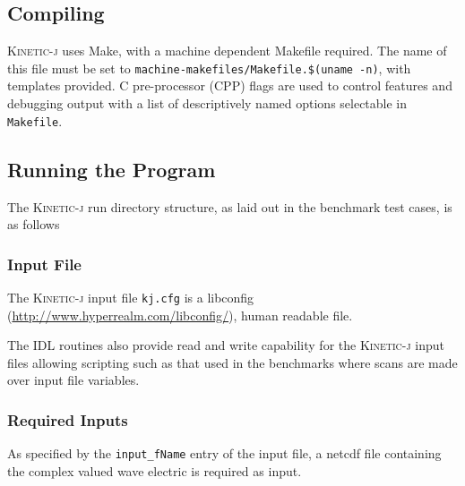 \documentclass[final,5p,times,twocolumn]{elsarticle}
\newcommand{\kj}{\textsc{Kinetic-j}\xspace}
\begin{document}
\subsection{Compiling}
\label{section:compiling}
%
\kj uses Make, with a machine dependent Makefile required. The name of this file must be set to \texttt{machine-makefiles/Makefile.\$(uname -n)}, with templates provided. C pre-processor (CPP) flags are used to control features and debugging output with a list of descriptively named options selectable in \texttt{Makefile}. 

\subsection{Running the Program}
\label{section:running}
%
The \kj run directory structure, as laid out in the benchmark test cases, is as follows

\subsubsection{Input File}
\label{section:input_file}
The \kj input file \texttt{kj.cfg} is a libconfig (\url{http://www.hyperrealm.com/libconfig/}), human readable file. 
%
 
%
The IDL routines also provide read and write capability for the \kj input files allowing scripting such as that used in the benchmarks where scans are made over input file variables.  
%
\subsubsection{Required Inputs}
\label{section:inputs}
As specified by the \lstinline{input_fName} entry of the input file, a netcdf file containing the complex valued wave electric is required as input. 
 
%
\end{document}
